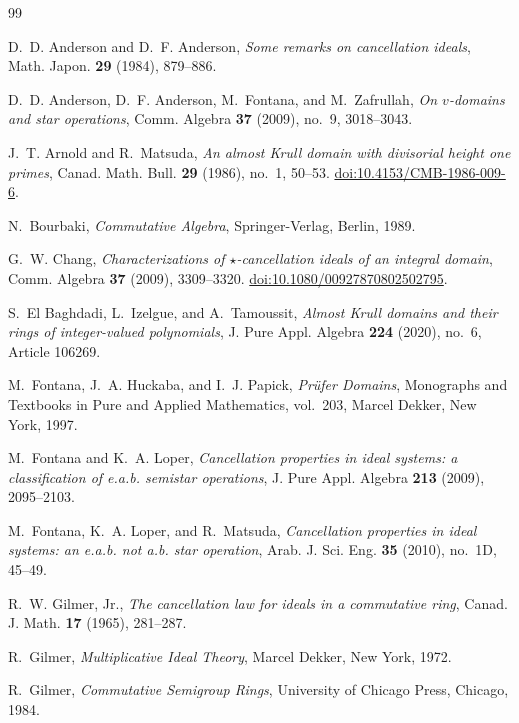 \documentclass[11pt]{amsart}
\theoremstyle{definition}
\theoremstyle{remark}
\begin{document}
\begin{thebibliography}{99}

D.~D. Anderson and D.~F. Anderson,
\emph{Some remarks on cancellation ideals},
Math. Japon. \textbf{29} (1984), 879--886.

D.~D. Anderson, D.~F. Anderson, M.~Fontana, and M.~Zafrullah,
\emph{On $v$-domains and star operations},
Comm. Algebra \textbf{37} (2009), no.~9, 3018--3043.

J.~T. Arnold and R.~Matsuda,
\emph{An almost Krull domain with divisorial height one primes},
Canad. Math. Bull. \textbf{29} (1986), no.~1, 50--53.
\href{https://doi.org/10.4153/CMB-1986-009-6}{doi:10.4153/CMB-1986-009-6}.

N.~Bourbaki,
\emph{Commutative Algebra},
Springer-Verlag, Berlin, 1989.

G.~W. Chang,
\emph{Characterizations of $\star$-cancellation ideals of an integral domain},
Comm. Algebra \textbf{37} (2009), 3309--3320.
\href{https://doi.org/10.1080/00927870802502795}{doi:10.1080/00927870802502795}.

S.~El Baghdadi, L.~Izelgue, and A.~Tamoussit,
\emph{Almost Krull domains and their rings of integer-valued polynomials},
J. Pure Appl. Algebra \textbf{224} (2020), no.~6, Article 106269.

M.~Fontana, J.~A. Huckaba, and I.~J. Papick,
\emph{Pr\"ufer Domains},
Monographs and Textbooks in Pure and Applied Mathematics, vol.~203,
Marcel Dekker, New York, 1997.

M.~Fontana and K.~A. Loper,
\emph{Cancellation properties in ideal systems: a classification of e.a.b.
semistar operations},
J. Pure Appl. Algebra \textbf{213} (2009), 2095--2103.

M.~Fontana, K.~A. Loper, and R.~Matsuda,
\emph{Cancellation properties in ideal systems: an e.a.b. not a.b. star
operation},
Arab. J. Sci. Eng. \textbf{35} (2010), no.~1D, 45--49.

R.~W. Gilmer, Jr.,
\emph{The cancellation law for ideals in a commutative ring},
Canad. J. Math. \textbf{17} (1965), 281--287.

R.~Gilmer,
\emph{Multiplicative Ideal Theory},
Marcel Dekker, New York, 1972.

R.~Gilmer,
\emph{Commutative Semigroup Rings},
University of Chicago Press, Chicago, 1984.


\end{thebibliography}
\end{document}
